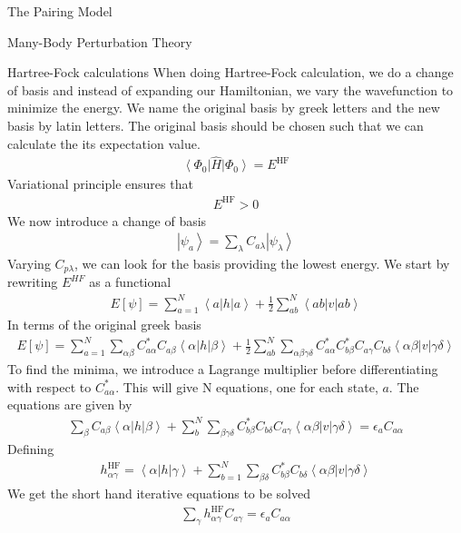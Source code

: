 \documentclass[twoside,english]{uiofysmaster}
\begin{document}
\begin{chapter}{The Pairing Model}
\begin{section}{Many-Body Perturbation Theory}
 	\begin{subsection}{Hartree-Fock calculations}
 		When doing Hartree-Fock calculation, we do a change of basis and instead of expanding our Hamiltonian, we vary the wavefunction to minimize the energy. We name the original basis by greek letters and the new basis by latin letters. The original basis should be chosen such that we can calculate the its expectation value. 
 		\begin{align}
 			\left< \Phi_0 \right| \hat H \left| \Phi_0 \right> = E^{\text{HF}}
 		\end{align}
 		Variational principle ensures that 
 		\begin{align}
 			E^{\text{HF}} > 0 
 		\end{align}
 		We now introduce a change of basis 
 		\begin{align}
 			\left| \psi_a \right> = \sum_{\lambda} C_{a\lambda} \left| \psi_{\lambda} \right>
 		\end{align}
 		Varying $C_{p\lambda}$, we can look for the basis providing the lowest energy. We start by rewriting $E^{HF}$ as a functional
 		\begin{align}
 			E\left[ \psi \right] = \sum_{a=1}^N \left< a \right| h \left| a \right> + \frac{1}{2} \sum_{ab}^N \left< ab \right| v \left| ab \right>
  		\end{align}
  		In terms of the original greek basis
  		\begin{align}
  			E\left[ \psi \right] = \sum_{a=1}^N \sum_{\alpha \beta} C_{a \alpha}^* C_{a \beta} \left< \alpha \right| h \left| \beta \right> + \frac{1}{2} \sum_{ab}^N \sum_{\alpha \beta \gamma \delta} C_{a \alpha}^* C_{b \beta}^* C_{a \gamma} C_{b \delta} \left< \alpha \beta \right| v \left| \gamma \delta \right>
  		\end{align}
  		To find the minima, we introduce a Lagrange multiplier before differentiating with respect to $C_{a  \alpha}^*$. This will give N equations, one for each state, $a$. The equations are given by
  		\begin{align}
  			\sum_{\beta} C_{a \beta} \left< \alpha \right| h \left| \beta \right> + \sum_b^N \sum_{\beta \gamma \delta} C_{b \beta}^* C_{b \delta} C_{a \gamma} \left< \alpha \beta \right| v \left| \gamma \delta \right> = \epsilon_a C_{a \alpha}
  		\end{align}
  		Defining
  		\begin{align}
  			h_{\alpha \gamma}^{\text{HF}} = \left< \alpha \right| h \left| \gamma \right> + \sum_{b=1}^N \sum_{\beta \delta} C_{b \beta}^* C_{b \delta} \left< \alpha \beta \right| v \left| \gamma \delta \right> 
  		\end{align}
  		We get the short hand iterative equations to be solved 
  		\begin{align}
  			\sum_{\gamma} h_{\alpha \gamma}^{\text{HF}} C_{a \gamma} = \epsilon_{a} C_{a \alpha}
  		\end{align}
 	\end{subsection}


\end{section}
\end{chapter}
\end{document}
